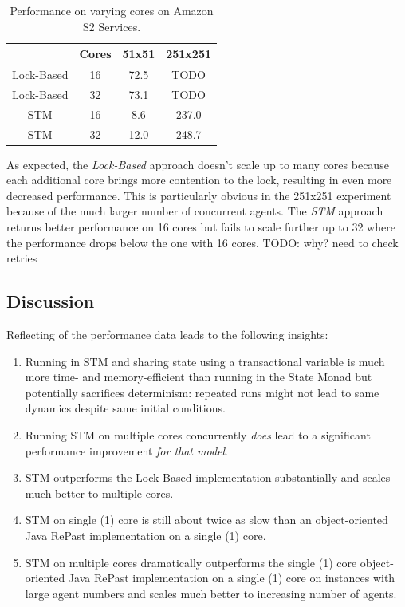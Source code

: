 \begin{table}
	\centering
  	\begin{tabular}{ c || c | c | c }
                   & Cores & 51x51   & 251x251 \\ \hline \hline 
    	Lock-Based & 16    & 72.5    & TODO    \\ \hline
    	Lock-Based & 32    & 73.1    & TODO    \\ \hline \hline 
   		
   		STM        & 16    & 8.6     & 237.0   \\ \hline
   		STM        & 32    & 12.0    & 248.7   \\ \hline
   	\end{tabular}
  	
  	\caption{Performance on varying cores on Amazon S2 Services.}
	\label{tab:sir_varying_cores_amazon}
\end{table}

As expected, the \textit{Lock-Based} approach doesn't scale up to many cores because each additional core brings more contention to the lock, resulting in even more decreased performance. This is particularly obvious in the 251x251 experiment because of the much larger number of concurrent agents. The \textit{STM} approach returns better performance on 16 cores but fails to scale further up to 32 where the performance drops below the one with 16 cores. TODO: why? need to check retries  %

\subsection{Discussion}
Reflecting of the performance data leads to the following insights:
\begin{enumerate}
	\item Running in STM and sharing state using a transactional variable is much more time- and memory-efficient than running in the State Monad but potentially sacrifices determinism: repeated runs might not lead to same dynamics despite same initial conditions.
	\item Running STM on multiple cores concurrently \textit{does} lead to a significant performance improvement \textit{for that model}.
	\item STM outperforms the Lock-Based implementation substantially and scales much better to multiple cores.
	\item STM on single (1) core is still about twice as slow than an object-oriented Java RePast implementation on a single (1) core.
	\item STM on multiple cores dramatically outperforms the single (1) core object-oriented Java RePast implementation on a single (1) core on instances with large agent numbers and scales much better to increasing number of agents.
\end{enumerate}